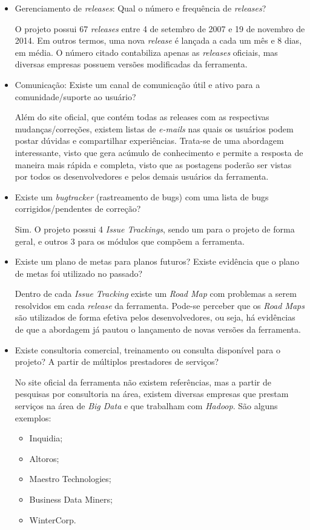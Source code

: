 \documentclass[12pt,a4paper]{article} %
\begin{document}
\begin{itemize}
\item Gerenciamento de \textit{releases}: Qual o número e frequência de \textit{releases}?

O projeto possui 67 \emph{releases} entre 4 de setembro de 2007 e 19 de novembro de 2014. Em outros termos, uma nova \emph{release} é lançada a cada um mês e 8 dias, em média. O número citado contabiliza apenas as \emph{releases} oficiais, mas diversas empresas possuem versões modificadas da ferramenta.

\item Comunicação: Existe um canal de comunicação útil e ativo para a comunidade/suporte ao usuário?

Além do site oficial, que contém todas as releases com as respectivas mudanças/correções, existem listas de \emph{e-mails} nas quais os usuários podem postar dúvidas e compartilhar experiências. Trata-se de uma abordagem interessante, visto que gera acúmulo de conhecimento e permite a resposta de maneira mais rápida e completa, visto que as postagens poderão ser vistas por todos os desenvolvedores e pelos demais usuários da ferramenta.

\item Existe um \textit{bugtracker} (rastreamento de bugs) com uma lista de bugs corrigidos/pendentes de correção?

Sim. O projeto possui 4 \emph{Issue Trackings}, sendo um para o projeto de forma geral, e outros 3 para os módulos que compõem a ferramenta.

\item Existe um plano de metas para planos futuros? Existe evidência que o plano de metas foi utilizado no passado?

Dentro de cada \emph{Issue Tracking} existe um \emph{Road Map} com problemas a serem resolvidos em cada \emph{release} da ferramenta. Pode-se perceber que os \emph{Road Maps} são utilizados de forma efetiva pelos desenvolvedores, ou seja, há evidências de que a abordagem já pautou o lançamento de novas versões da ferramenta.

\item Existe consultoria comercial, treinamento ou consulta disponível para o projeto? A partir de múltiplos prestadores de serviços?  

No site oficial da ferramenta não existem referências, mas a partir de pesquisas por consultoria na área, existem diversas empresas que prestam serviços na área de \emph{Big Data} e que trabalham com \emph{Hadoop}. São alguns exemplos:
\begin{itemize}
\item Inquidia;
\item Altoros;
\item Maestro Technologies;
\item Business Data Miners;
\item WinterCorp.
\end{itemize}       
\end{itemize}
        

\par\vspace{\baselineskip}

\end{document}
